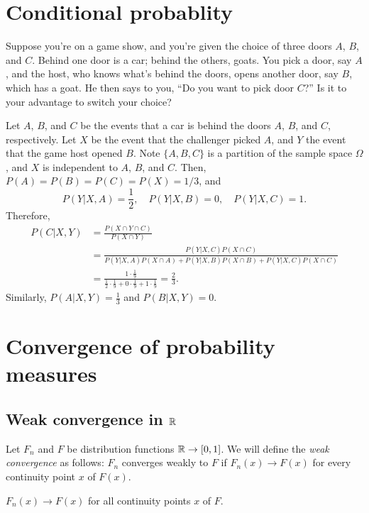 \documentclass{../note}
\begin{document}
\begin{prb}

\end{prb}







\chapter{Conditional probablity}

\begin{prb}
Suppose you're on a game show, and you're given the choice of three doors $A$, $B$, and $C$.
Behind one door is a car; behind the others, goats.
You pick a door, say $A$, and the host, who knows what's behind the doors, opens another door, say $B$, which has a goat.
He then says to you, ``Do you want to pick door $C$?''
Is it to your advantage to switch your choice?
\end{prb}
\begin{pf}
Let $A$, $B$, and $C$ be the events that a car is behind the doors $A$, $B$, and $C$, respectively.
Let $X$ be the event that the challenger picked $A$, and $Y$ the event that the game host opened $B$.
Note $\{A,B,C\}$ is a partition of the sample space $\Omega$, and $X$ is independent to $A$, $B$, and $C$.
Then, $P(A)=P(B)=P(C)=P(X)=1/3$, and
\[P(Y|X,A)=\frac12,\quad P(Y|X,B)=0,\quad P(Y|X,C)=1.\]
Therefore,
\begin{align*}
P(C|X,Y)&=\frac{P(X\cap Y\cap C)}{P(X\cap Y)}\\
&=\frac{P(Y|X,C)P(X\cap C)}{P(Y|X,A)P(X\cap A)+P(Y|X,B)P(X\cap B)+P(Y|X,C)P(X\cap C)}\\
&=\frac{1\cdot \frac19}{\frac12\cdot\frac19+0\cdot\frac19+1\cdot\frac19}=\frac23.
\end{align*}
Similarly, $P(A|X,Y)=\frac13$ and $P(B|X,Y)=0$.
\end{pf}










\chapter{Convergence of probability measures}


\section{Weak convergence in $\mathbb{R}$}
\begin{prb}
Let $F_n$ and $F$ be distribution functions $\mathbb{R}\to[0,1]$.
We will define the \emph{weak convergence} as follows: $F_n$ converges weakly to $F$ if $F_n(x)\to F(x)$ for every continuity point $x$ of $F(x)$.
\begin{parts}
\item $F_n(x)\to F(x)$ for all continuity points $x$ of $F$.
\end{parts}
\end{prb}
\end{document}
